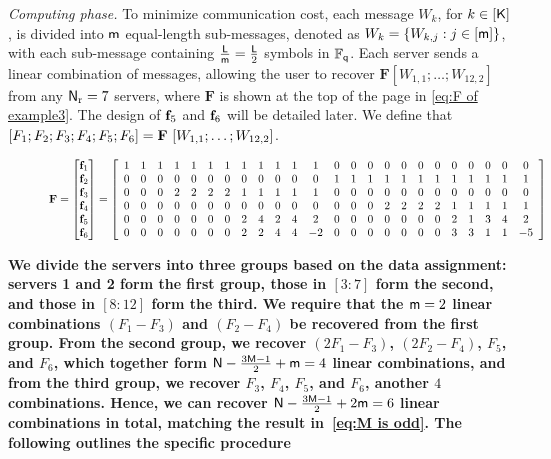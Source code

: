 \documentclass[conference,letterpaper]{IEEEtran}
\begin{document}
\begin{example}
{\it Computing phase.}
To minimize communication cost, each message $W_k$, for $k \in [{\sf K}]$, is divided into ${\sf m}$ equal-length sub-messages, denoted as $W_k = \{W_{k,j} : j \in [{\sf m}]\}$, with each sub-message containing $\frac{{\sf L}}{{\sf m}} = \frac{{\sf L}}{2}$ symbols in $\mathbb{F}_{{\sf q}}$. Each server sends a linear combination of messages, allowing the user to recover
\(\mathbf{F} [W_{1,1}; \ldots; W_{12,2}]\) from any \({\sf N}_{\rm r} = 7\) servers, where
\(\mathbf{F}\) is shown at the top of the page in \eqref{eq:F of example3}. The design of \({\bf f}_5\) and \({\bf f}_6\) will be detailed later.
We define that $[F_1;F_2;F_3;F_4;F_5;F_6]=  {\bf F} \  [W_{1,1};\ldots;W_{12,2}] $.
\begin{figure}
\begin{equation}
\scalebox{0.8}{%
\(
{\bf F} = \begin{bmatrix}  
 {\fv}_1 \\
 {\fv}_2 \\
 {\fv}_3 \\
 {\fv}_4\\
 {\fv}_5 \\
 {\fv}_6
\end{bmatrix}
=
\left[
\begin{array}{cccccccccccccccccccccccc}
  1 & 1 & 1 & 1 & 1 & 1 & 1 & 1 & 1 & 1 & 1 & 1 & 0 & 0 & 0 & 0 & 0 & 0 & 0 & 0 & 0 & 0 & 0 & 0 \\
  0 & 0 & 0 & 0 & 0 & 0 & 0 & 0 & 0 & 0 & 0 & 0 & 1 & 1 & 1 & 1 & 1 & 1 & 1 & 1 & 1 & 1 & 1 & 1 \\
  0 & 0 & 0 & 2 & 2 & 2 & 2 & 1 & 1 & 1 & 1 & 1 & 0 & 0 & 0 & 0 & 0 & 0 & 0 & 0 & 0 & 0 & 0 & 0 \\
  0 & 0 & 0 & 0 & 0 & 0 & 0 & 0 & 0 & 0 & 0 & 0 & 0 & 0 & 0 & 2 & 2 & 2 & 2 & 1 & 1 & 1 & 1 & 1 \\
  0 & 0 & 0 & 0 & 0 & 0 & 0 & 2 & 4 & 2 & 4 & 2 & 0 & 0 & 0 & 0 & 0 & 0 & 0 & 2 & 1 & 3 & 4 & 2 \\
  0 & 0 & 0 & 0 & 0 & 0 & 0 & 2 & 2 & 4 & 4 & -2 & 0 & 0 & 0 & 0 & 0 & 0 & 0 & 3 & 3 & 1 & 1 & -5 \\
\end{array}
\right]
\)
}
\label{eq:F of example3}
\end{equation}
\end{figure}


\textbf{We divide the servers into three groups based on the data assignment: servers 1 and 2 form the first group, those in $[3:7]$ form the second, and those in $[8:12]$ form the third. We require that the ${\sf m}=2$ linear combinations \((F_1 - F_3)\) and \((F_2 - F_4)\) be recovered from the first group. From the second group, we recover \((2F_1 - F_3)\), \((2F_2 - F_4)\), \(F_5\), and \(F_6\), which together form \({\sf N} - \frac{3{\sf M} - 1}{2} + {\sf m} = 4\) linear combinations, and from the third group, we recover \(F_3\), \(F_4\), \(F_5\), and \(F_6\), another \(4\) combinations. Hence, we can recover 
${\sf N} - \frac{3{\sf M} - 1}{2} + 2{\sf m} = 6$ linear combinations in total, matching the result in~\eqref{eq:M is odd}. The following outlines the specific procedure}




\end{example}
\end{document}
